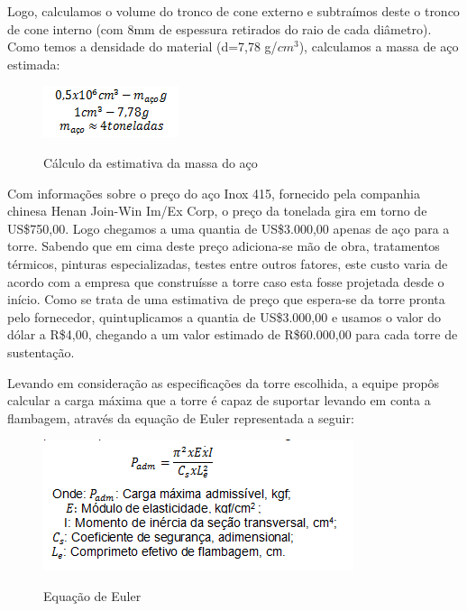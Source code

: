 Logo, calculamos o volume do tronco de cone externo e subtraímos deste o tronco de cone interno (com 8mm de espessura retirados do raio de cada diâmetro). Como temos a densidade do material (d=7,78 g/$cm^3$), calculamos a massa de aço estimada:
 \begin{figure}[!h]
    \centering
    \includegraphics[scale = 1]{editaveis/figuras/massa_aco}
    \label{massa_aco}
    \caption[Cálculo da estimativa da massa do aço]{Cálculo da estimativa da massa do aço}
   \end{figure}
   \FloatBarrier
   
Com informações sobre o preço do aço Inox 415, fornecido pela companhia chinesa Henan Join-Win Im/Ex Corp, o preço da tonelada gira em torno de US\$750,00. \footnotemark Logo chegamos a uma quantia de US\$3.000,00 apenas de aço para a torre. Sabendo que em cima deste preço adiciona-se mão de obra, tratamentos térmicos, pinturas especializadas, testes entre outros fatores, este custo varia de acordo com a empresa que construísse a torre caso esta fosse projetada desde o início. Como se trata de uma estimativa de preço que espera-se da torre pronta pelo fornecedor, quintuplicamos a quantia de US\$3.000,00 e usamos o valor do dólar a R\$4,00, chegando a um valor estimado de R\$60.000,00 para cada torre de sustentação.

Levando em consideração as especificações da torre escolhida, a equipe propôs calcular a carga máxima que a torre é capaz de suportar levando em conta a flambagem, através da equação de Euler representada a seguir: 
 \begin{figure}[!h]
    \centering
    \includegraphics[scale = 1]{editaveis/figuras/eq_euler}
    \label{eq_euler}
    \caption[Equação de Euler]{Equação de Euler}
   \end{figure}
   \FloatBarrier
 
